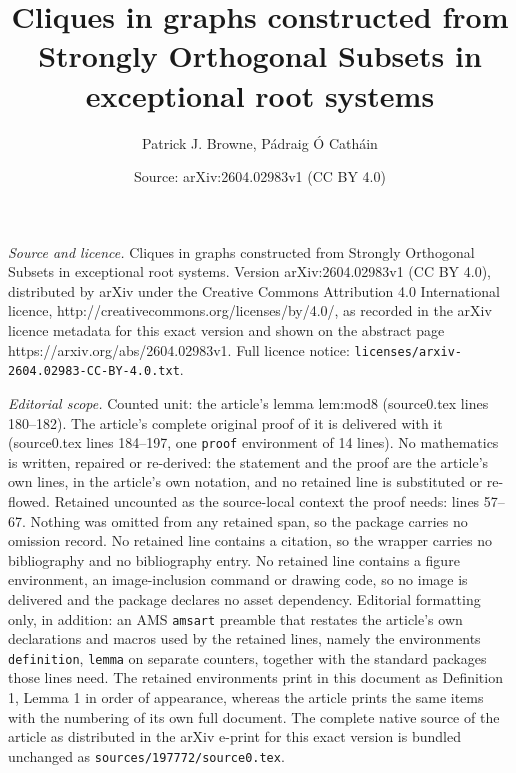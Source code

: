 \documentclass[10pt,a4paper]{amsart}
\title{Cliques in graphs constructed from Strongly Orthogonal Subsets in exceptional root systems}
\author{Patrick J. Browne, P\'adraig \'O Cath\'ain}
\date{Source: arXiv:2604.02983v1 (CC BY 4.0)}
\begin{document}
\maketitle

\noindent\emph{Source and licence.} Cliques in graphs constructed from Strongly Orthogonal Subsets in exceptional root systems. Version arXiv:2604.02983v1 (CC BY 4.0), distributed by arXiv under the Creative Commons Attribution 4.0 International licence, http://creativecommons.org/licenses/by/4.0/, as recorded in the arXiv licence metadata for this exact version and shown on the abstract page https://arxiv.org/abs/2604.02983v1. Full licence notice: \texttt{licenses/arxiv-2604.02983-CC-BY-4.0.txt}.\par\smallskip

\noindent\textit{Editorial scope.} Counted unit: the article's lemma lem:mod8 (source0.tex lines 180--182). The article's complete original proof of it is delivered with it (source0.tex lines 184--197, one \texttt{proof} environment of 14 lines). No mathematics is written, repaired or re-derived: the statement and the proof are the article's own lines, in the article's own notation, and no retained line is substituted or re-flowed.  Retained uncounted as the source-local context the proof needs: lines 57--67.  Nothing was omitted from any retained span, so the package carries no omission record.  No retained line contains a citation, so the wrapper carries no bibliography and no bibliography entry.  No retained line contains a figure environment, an image-inclusion command or drawing code, so no image is delivered and the package declares no asset dependency.  Editorial formatting only, in addition: an AMS \texttt{amsart} preamble that restates the article's own declarations and macros used by the retained lines, namely the environments \texttt{definition}, \texttt{lemma} on separate counters, together with the standard packages those lines need.  The retained environments print in this document as Definition 1, Lemma 1 in order of appearance, whereas the article prints the same items with the numbering of its own full document.  The complete native source of the article as distributed in the arXiv e-print for this exact version is bundled unchanged as \texttt{sources/197772/source0.tex}.
\end{document}

